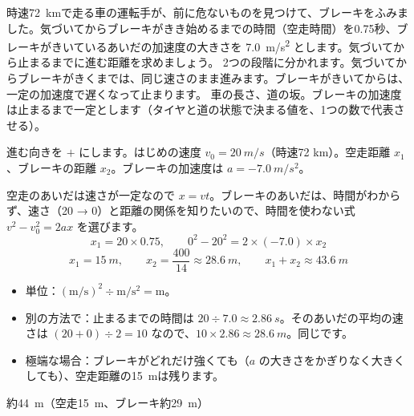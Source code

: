 \begin{phreidai}[気づいてから止まるまで]
\label{ph:力-1:ex2}時速\qty{72}{km}で走る車の運転手が、前に危ないものを見つけて、ブレーキをふみました。気づいてからブレーキがきき始めるまでの時間（空走時間）を0.75秒、ブレーキがきいているあいだの加速度の大きさを \qty{7.0}{m/s^2} とします。気づいてから止まるまでに進む距離を求めましょう。
\phbamen
2つの段階に分かれます。気づいてからブレーキがきくまでは、同じ速さのまま進みます。ブレーキがきいてからは、一定の加速度で遅くなって止まります。
\phmushi
車の長さ、道の坂。ブレーキの加速度は止まるまで一定とします（タイヤと道の状態で決まる値を、1つの数で代表させる）。
\phzu
\noindent\begin{minipage}[c]{0.57\linewidth}\centering
{}
\end{minipage}\hfill
\begin{minipage}[c]{0.4\linewidth}
進む向きを $+$ にします。はじめの速度 $v_0=\qty{20}{m/s}$（時速72 km）。空走距離 $x_1$、ブレーキの距離 $x_2$。ブレーキの加速度は $a=\qty{-7.0}{m/s^2}$。
\end{minipage}
\phriyu
空走のあいだは速さが一定なので $x=vt$。ブレーキのあいだは、時間がわからず、速さ（20 → 0）と距離の関係を知りたいので、時間を使わない式 $v^2-v_0^2=2ax$ を選びます。
\phtateru
\[ x_1=20\times0.75,\qquad 0^2-20^2=2\times(-7.0)\times x_2 \]
\phtoku
\[ x_1=\qty{15}{m},\qquad x_2=\frac{400}{14}\approx\qty{28.6}{m},\qquad x_1+x_2\approx\qty{43.6}{m} \]
\phtashikame
\begin{itemize}[leftmargin=1.2\zw, itemsep=1pt, topsep=1pt, label={\color{bkTheme}●}]
\item 単位：$(\mathrm{m/s})^2\div\mathrm{m/s^2}=\mathrm m$。
\item 別の方法で：止まるまでの時間は $20\div7.0\approx\qty{2.86}{s}$。そのあいだの平均の速さは $(20+0)\div2=10$ なので、$10\times2.86\approx\qty{28.6}{m}$。同じです。
\item 極端な場合：ブレーキがどれだけ強くても（$a$ の大きさをかぎりなく大きくしても）、空走距離の\qty{15}{m}は残ります。
\end{itemize}
\kotae 約\qty{44}{m}（空走\qty{15}{m}、ブレーキ約\qty{29}{m}）
\end{phreidai}
